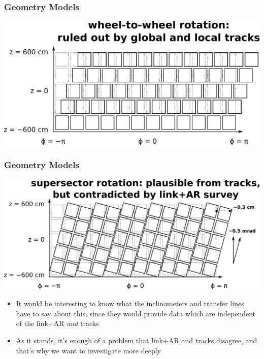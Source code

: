 \documentclass[compress]{beamer}
\begin{document}

\small

\begin{frame}
\frametitle{Geometry Models}
\includegraphics[width=\linewidth]{model1.pdf}
\end{frame}

\begin{frame}
\frametitle{Geometry Models}
\includegraphics[width=\linewidth]{model2.pdf}
\begin{itemize}
\item It would be interesting to know what the inclinometers and
  transfer lines have to say about this, since they would provide data
  which are independent of the link+AR {\it and} tracks
\item As it stands, it's enough of a problem that link+AR and tracks
  disagree, and that's why we want to investigate more deeply
\end{itemize}
\end{frame}
\end{document}
